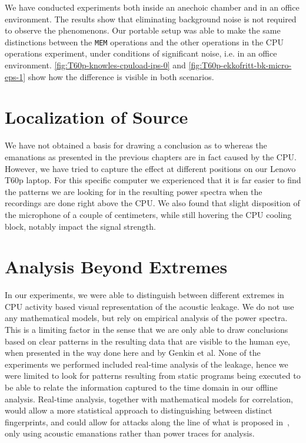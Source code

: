 We have conducted experiments both inside an anechoic chamber and in an office environment.
The results show that eliminating background noise is not required to observe the phenomenons.
Our portable setup was able to make the same distinctions between the \texttt{MEM} operations and the other operations in the CPU operations experiment, under conditions of significant noise, i.e. in an office environment.
\autoref{fig:T60p-knowles-cpuload-ips-0} and \autoref{fig:T60p-ekkofritt-bk-micro-eps-1} show how the difference is visible in both scenarios.


\section{Localization of Source}
We have not obtained a basis for drawing a conclusion as to whereas the emanations as presented in the previous chapters are in fact caused by the \gls{CPU}.
However, we have tried to capture the effect at different positions on our Lenovo T60p laptop. 
For this specific computer we experienced that it is far easier to find the patterns we are looking for in the resulting power spectra when the recordings are done right above the \gls{CPU}.
We also found that slight disposition of the microphone of a couple of centimeters, while still hovering the \gls{CPU} cooling block, notably impact the signal strength.


\section{Analysis Beyond Extremes}
In our experiments, we were able to distinguish between different extremes in \gls{CPU} activity based visual representation of the acoustic leakage. 
We do not use any mathematical models, but rely on empirical analysis of the power spectra. 
This is a limiting factor in the sense that we are only able to draw conclusions based on clear patterns in the resulting data that are visible to the human eye, when presented in the way done here and by Genkin et al.
None of the experiments we performed included real-time analysis of the leakage, hence we were limited to look for patterns resulting from static programs being executed to be able to relate the information captured to the time domain in our offline analysis.
Real-time analysis, together with mathematical models for correlation, would allow a more statistical approach to distinguishing between distinct fingerprints, and could allow for attacks along the line of what is proposed in~\cite{DBLP:conf/crypto/KocherJJ99}, only using acoustic emanations rather than power traces for analysis.


